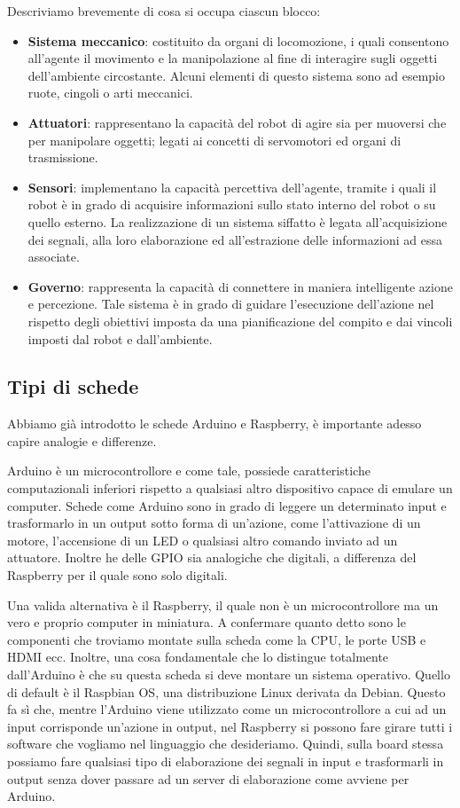 \documentclass[a4paper,12pt,italian]{article}
\begin{document}
Descriviamo brevemente di cosa si occupa ciascun blocco:
\begin{itemize}
	\item \textbf{Sistema meccanico}: costituito da organi di locomozione, i quali consentono all’agente il movimento e la manipolazione al fine di interagire sugli oggetti dell’ambiente circostante. Alcuni elementi di questo sistema sono ad esempio ruote, cingoli o arti meccanici.
	\item \textbf{Attuatori}: rappresentano la capacità del robot di agire sia per muoversi che per manipolare oggetti; legati ai concetti di servomotori ed organi di trasmissione.
	\item \textbf{Sensori}: implementano la capacità percettiva dell’agente, tramite i quali il robot è in grado di acquisire informazioni sullo stato interno del robot o su quello esterno. La realizzazione di un sistema siffatto è legata all’acquisizione dei segnali, alla loro elaborazione ed all’estrazione delle informazioni ad essa associate.
	\item \textbf{Governo}: rappresenta la capacità di connettere in maniera intelligente azione e percezione. Tale sistema è in grado di guidare l’esecuzione dell’azione nel rispetto degli obiettivi imposta da una pianificazione del compito e dai vincoli imposti dal robot e dall’ambiente.
\end{itemize}

\subsection{Tipi di schede}
Abbiamo già introdotto le schede Arduino e Raspberry, è importante adesso capire analogie e differenze. 

Arduino è un microcontrollore e come tale, possiede caratteristiche computazionali inferiori rispetto a qualsiasi altro dispositivo capace di emulare un computer. Schede come Arduino sono in grado di leggere un determinato input e trasformarlo in un output sotto forma di un’azione, come l’attivazione di un motore, l’accensione di un LED o qualsiasi altro comando inviato ad un attuatore. Inoltre he delle GPIO sia analogiche che digitali, a differenza del Raspberry per il quale sono solo digitali. 

Una valida alternativa è il Raspberry, il quale non è un microcontrollore ma un vero e proprio computer in miniatura. A confermare quanto detto sono le componenti che troviamo montate sulla scheda come la CPU, le porte USB e HDMI ecc. Inoltre, una cosa fondamentale che lo distingue totalmente dall’Arduino è che su questa scheda si deve montare un sistema operativo. Quello di default è il Raspbian OS, una distribuzione Linux derivata da Debian. Questo fa sì che, mentre l’Arduino viene utilizzato come un microcontrollore a cui ad un input corrisponde un’azione in output, nel Raspberry si possono fare girare tutti i software che vogliamo nel linguaggio che desideriamo. Quindi, sulla board stessa possiamo fare qualsiasi tipo di elaborazione dei segnali in input e trasformarli in output senza dover passare ad un server di elaborazione come avviene per Arduino.
\end{document}
